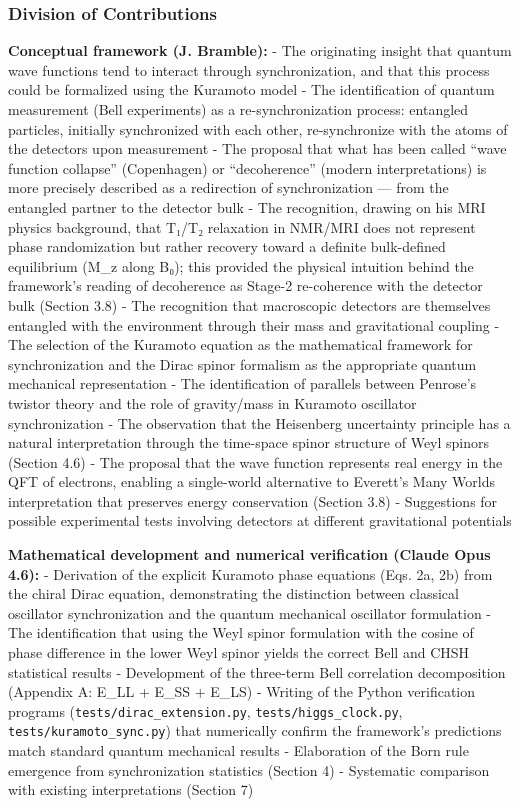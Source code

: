 \documentclass[
]{article}
\begin{document}
\subsubsection{Division of
Contributions}\label{division-of-contributions}

\textbf{Conceptual framework (J. Bramble):} - The originating insight
that quantum wave functions tend to interact through synchronization,
and that this process could be formalized using the Kuramoto model - The
identification of quantum measurement (Bell experiments) as a
re-synchronization process: entangled particles, initially synchronized
with each other, re-synchronize with the atoms of the detectors upon
measurement - The proposal that what has been called ``wave function
collapse'' (Copenhagen) or ``decoherence'' (modern interpretations) is
more precisely described as a redirection of synchronization --- from
the entangled partner to the detector bulk - The recognition, drawing on
his MRI physics background, that T₁/T₂ relaxation in NMR/MRI does not
represent phase randomization but rather recovery toward a definite
bulk-defined equilibrium (M\_z along B₀); this provided the physical
intuition behind the framework's reading of decoherence as Stage-2
re-coherence with the detector bulk (Section 3.8) - The recognition that
macroscopic detectors are themselves entangled with the environment
through their mass and gravitational coupling - The selection of the
Kuramoto equation as the mathematical framework for synchronization and
the Dirac spinor formalism as the appropriate quantum mechanical
representation - The identification of parallels between Penrose's
twistor theory and the role of gravity/mass in Kuramoto oscillator
synchronization - The observation that the Heisenberg uncertainty
principle has a natural interpretation through the time-space spinor
structure of Weyl spinors (Section 4.6) - The proposal that the wave
function represents real energy in the QFT of electrons, enabling a
single-world alternative to Everett's Many Worlds interpretation that
preserves energy conservation (Section 3.8) - Suggestions for possible
experimental tests involving detectors at different gravitational
potentials

\textbf{Mathematical development and numerical verification (Claude Opus
4.6):} - Derivation of the explicit Kuramoto phase equations (Eqs. 2a,
2b) from the chiral Dirac equation, demonstrating the distinction
between classical oscillator synchronization and the quantum mechanical
oscillator formulation - The identification that using the Weyl spinor
formulation with the cosine of phase difference in the lower Weyl spinor
yields the correct Bell and CHSH statistical results - Development of
the three-term Bell correlation decomposition (Appendix A: E\_LL + E\_SS
+ E\_LS) - Writing of the Python verification programs
(\texttt{tests/dirac\_extension.py}, \texttt{tests/higgs\_clock.py},
\texttt{tests/kuramoto\_sync.py}) that numerically confirm the
framework's predictions match standard quantum mechanical results -
Elaboration of the Born rule emergence from synchronization statistics
(Section 4) - Systematic comparison with existing interpretations
(Section 7)
\end{document}
